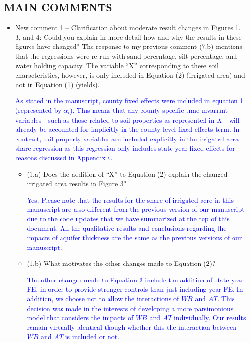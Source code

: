 \documentclass[
]{article}
\begin{document}
\subsection{MAIN COMMENTS}

\begin{itemize}
\item New comment 1 – Clarification about moderate result changes in Figures 1, 3, and 4: Could you explain in more detail how and why the results in these figures have changed? The response to my previous comment (7.b) mentions that the regressions were re-run with sand percentage, silt percentage, and water holding capacity. The variable ``X'' corresponding to these soil characteristics, however, is only included in Equation (2) (irrigated area) and not in Equation (1) (yields).

  \textcolor{blue}{As stated in the manuscript, county fixed effects were included in equation 1 (represented by $\alpha_i$). This means that any county-specific time-invariant variables - such as those related to soil properties as represented in $X$ - will already be accounted for implicitly in the county-level fixed effects term. In contrast, soil property variables are included explicitly in the irrigated area share regression as this regression only includes state-year fixed effects for reasons discussed in Appendix C}

  \begin{itemize}
  \item (1.a) Does the addition of ``X'' to Equation (2) explain the changed irrigated area results in Figure 3?

  \textcolor{blue}{Yes. Please note that the results for the share of irrigated acre in this manuscript are also different from the previous version of our manuscript  due to the code updates that we have summarized at the top of this document. All the qualitative results and conclusions regarding the impacts of aquifer thickness are the same as the previous versions of our manuscript.}
  
  \item (1.b) What motivates the other changes made to Equation (2)?

  \textcolor{blue}{The other changes made to Equation 2 include the addition of state-year FE, in order to provide stronger controls than just including year FE. In addition, we choose not to allow the interactions of $WB$ and $AT$. This decision was made in the interests of developing a more parsimonious model that considers the impacts of $WB$ and $AT$ individually. Our results remain virtually identical though whether this the interaction between $WB$ and $AT$ is included or not. }
  

\end{itemize}
\end{itemize}
\end{document}

